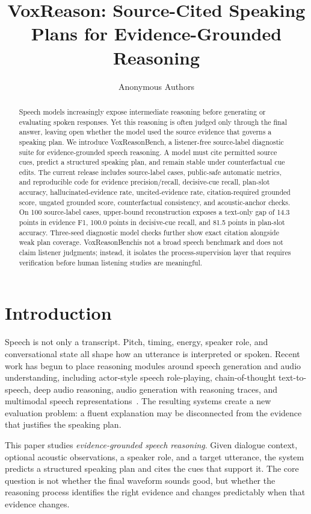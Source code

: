 \documentclass{article}
\title{VoxReason: Source-Cited Speaking Plans for Evidence-Grounded Reasoning}
\author{Anonymous Authors}
\newcommand{\method}{VoxReasonBench}
\begin{document}
\maketitle

\begin{abstract}
Speech models increasingly expose intermediate reasoning before generating or evaluating spoken responses. Yet this reasoning is often judged only through the final answer, leaving open whether the model used the source evidence that governs a speaking plan. We introduce \method, a listener-free source-label diagnostic suite for evidence-grounded speech reasoning. A model must cite permitted source cues, predict a structured speaking plan, and remain stable under counterfactual cue edits. The current release includes source-label cases, public-safe automatic metrics, and reproducible code for evidence precision/recall, decisive-cue recall, plan-slot accuracy, hallucinated-evidence rate, uncited-evidence rate, citation-required grounded score, ungated grounded score, counterfactual consistency, and acoustic-anchor checks. On 100 source-label cases, upper-bound reconstruction exposes a text-only gap of 14.3 points in evidence F1, 100.0 points in decisive-cue recall, and 81.5 points in plan-slot accuracy. Three-seed diagnostic model checks further show exact citation alongside weak plan coverage. \method is not a broad speech benchmark and does not claim listener judgments; instead, it isolates the process-supervision layer that requires verification before human listening studies are meaningful.
\end{abstract}

\section{Introduction}
Speech is not only a transcript. Pitch, timing, energy, speaker role, and conversational state all shape how an utterance is interpreted or spoken. Recent work has begun to place reasoning modules around speech generation and audio understanding, including actor-style speech role-playing, chain-of-thought text-to-speech, deep audio reasoning, audio generation with reasoning traces, and multimodal speech representations~\citep{actormind2026,cottts2026,mmar2025,thinksound2025,prismaudio2026,audiox2026,speechrepresentation2026}. The resulting systems create a new evaluation problem: a fluent explanation may be disconnected from the evidence that justifies the speaking plan.

This paper studies \emph{evidence-grounded speech reasoning}. Given dialogue context, optional acoustic observations, a speaker role, and a target utterance, the system predicts a structured speaking plan and cites the cues that support it. The core question is not whether the final waveform sounds good, but whether the reasoning process identifies the right evidence and changes predictably when that evidence changes.
\end{document}
